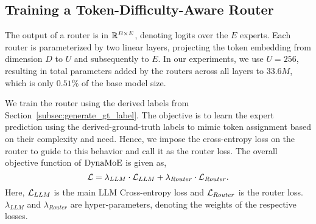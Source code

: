   

\subsection{Training a Token-Difficulty-Aware Router}
The output of a router is in $\mathbb{R}^{B \times E}$, denoting logits over the $E$ experts. Each router is parameterized by two linear layers, projecting the token embedding from dimension $D$ to $U$ and subsequently to $E$. In our experiments, we use $U=256$, resulting in total parameters added by the routers across all layers to $33.6M$, which is only $0.51\%$ of the base model size. 

We train the router using the derived labels from Section~\ref{subsec:generate_gt_label}. The objective is to learn the expert prediction using the derived-ground-truth labels to mimic token assignment based on their complexity and need. Hence, we impose the cross-entropy loss on the router to guide to this behavior and call it as the router loss. The overall objective function of $\operatorname{DynaMoE}$ is given as,
\begin{equation}\label{eq:loss}
    \mathcal{L} = \lambda_{LLM} \cdot \mathcal{L}_{LLM} + \lambda_{Router} \cdot \mathcal{L}_{Router}.
\end{equation}
Here, $\mathcal{L}_{LLM}$ is the main LLM Cross-entropy loss and $\mathcal{L}_{Router}$ is the router loss.  $\lambda_{LLM}$ and $\lambda_{Router}$ are hyper-parameters, denoting the weights of the respective losses.
